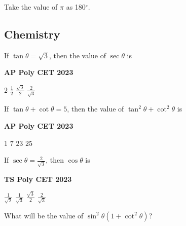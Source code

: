 \documentclass[11pt,paper=a4,answers]{exam}
\begin{document}
\begin{center}
\Large{Take the value of $\pi$ as 180${^\circ}$.}
\end{center}

\newpage






\subsection*{Chemistry}
\begin{multicols}{2}
\begin{questions}
\question
If $\tan  \theta = \sqrt{3}$, then the value of $\sec \theta$ is
\begin{flushright}
\small\textbf{AP Poly CET 2023}
\end{flushright}


\begin{choices}
\choice $\displaystyle 2$ 
\choice $\displaystyle \frac{1}{2}$ 
\choice $\displaystyle \frac{\sqrt{3}}{2}$ 
\choice $\displaystyle \frac{2}{\sqrt{3}}$  
\end{choices}






\question If $\tan  \theta + \cot \theta = 5$, then the value of $\tan^2  \theta + \cot^2 \theta $ is
\begin{flushright}
\small\textbf{AP Poly CET 2023}
\end{flushright}

\begin{choices}
\choice $\displaystyle 1$ 
\choice $\displaystyle 7$ 
\choice $\displaystyle 23$ 
\choice $\displaystyle 25$  
\end{choices}
\question If $\displaystyle \sec  \theta = \frac{2}{\sqrt{3}}$, then $\cos \theta$ is
\begin{flushright}
\small\textbf{TS Poly CET 2023}
\end{flushright}


\begin{choices}
\choice $\displaystyle \frac{1}{\sqrt{2}}$ 
\choice $\displaystyle \frac{1}{\sqrt{3}}$ 
\choice $\displaystyle \frac{\sqrt{3}}{2}$ 
\choice $\displaystyle \frac{2}{\sqrt{3}}$   
\end{choices}


\columnbreak
\question What will be the value of  $\sin^2 \theta \left(1+\cot^2 \theta \right)$?


\end{questions}
\end{multicols}
\end{document}
